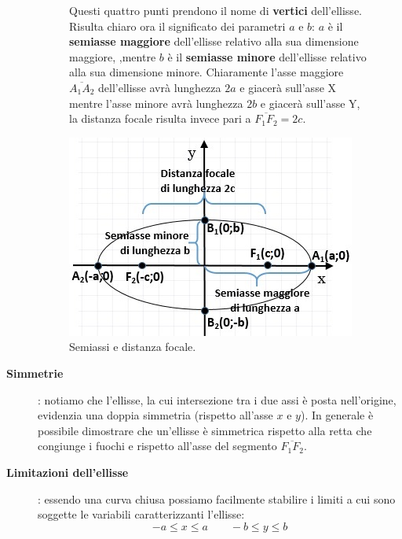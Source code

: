\begin{description}
\begin{figure}[h]
\begin{minipage}{.5\textwidth}
Questi quattro punti prendono il nome di \textbf{vertici} dell'ellisse. Risulta 
chiaro ora il significato dei parametri $a$ e $b$: $a$ è il \textbf{semiasse maggiore} 
dell'ellisse relativo alla sua dimensione maggiore, ,mentre $b$ è il \textbf{semiasse 
minore} dell'ellisse relativo alla sua dimensione minore. Chiaramente l'asse 
maggiore $\overline{A_{1}A_{2}}$ dell'ellisse avrà lunghezza $2a$ e giacerà 
sull'asse X mentre l'asse minore avrà lunghezza $2b$ e giacerà sull'asse Y, 
la distanza focale risulta invece pari a $\overline{F_{1}F_{2}}=2c$.
\end{minipage}
\hfill
\begin{minipage}{.5\textwidth}
\begin{center}
  \includegraphics[width=.9\textwidth]{img/semiassi.jpg}
  \caption{Semiassi e distanza focale.}
\end{center}
\end{minipage}
\end{figure}


\item [\textbf{Simmetrie}]: notiamo che l'ellisse, la cui intersezione tra i 
due assi è posta nell'origine, evidenzia una doppia simmetria (rispetto all'asse $x$ e $y$).
In generale è possibile dimostrare che un'ellisse è simmetrica rispetto alla retta che congiunge i 
fuochi e rispetto all'asse del segmento $\overline{F_{1}F_{2}}$. 

\item [\textbf{Limitazioni dell'ellisse}]: essendo una curva chiusa possiamo 
facilmente stabilire i limiti a cui sono soggette le variabili 
caratterizzanti l'ellisse:
\[-a \leq x \leq a \qquad -b\leq y \leq b\]


\end{description}
